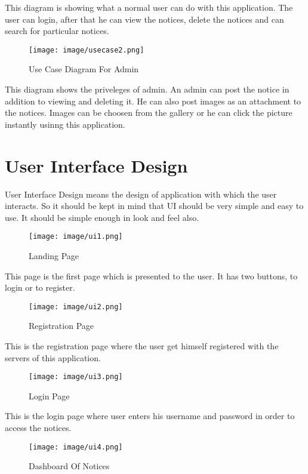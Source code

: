 This diagram is showing what a normal user can do with this application. The user can login, after that he can view the notices, delete the notices and can search for particular notices.

\begin{figure}[H]
\centering \texttt{[image: image/usecase2.png]}
\caption{Use Case Diagram For Admin}
\end{figure}

This diagram shows the priveleges of admin. An admin can post the notice in addition to viewing and deleting it. He can also post images as an attachment to the notices. Images can be choosen from the gallery or he can click the picture instantly usinng this application.






\pagebreak
\section{User Interface Design}
User Interface Design means the design of application with  which the user interacts. So it should be kept in mind that UI should be very simple and easy to use. It should be simple enough in look and feel also.
\begin{figure}[H]
\centering \texttt{[image: image/ui1.png]}
\caption{Landing Page}
\end{figure}

This page is the first page which is presented to the user. It has two buttons, to login or to register.

\begin{figure}[H]
\centering \texttt{[image: image/ui2.png]}
\caption{Registration Page}
\end{figure}

This is the registration page where the user get himself registered with the servers of this application.

\begin{figure}[H]
\centering \texttt{[image: image/ui3.png]}
\caption{Login Page}
\end{figure}

This is the login page where user enters his username and password in order to access the notices.

\begin{figure}[H]
\centering \texttt{[image: image/ui4.png]}
\caption{Dashboard Of Notices}
\end{figure}

